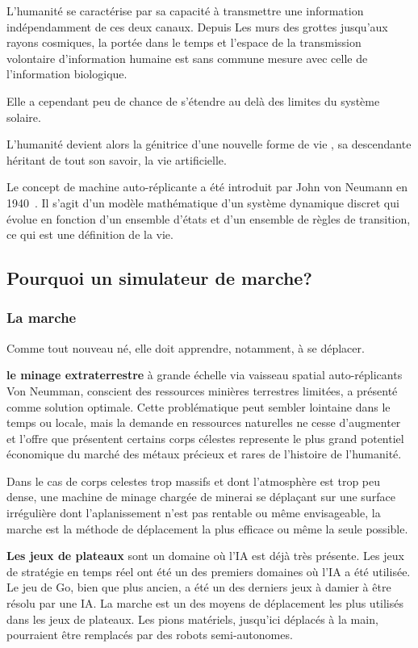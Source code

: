 \documentclass[journal, a4paper]{IEEEtran}
\begin{document}
	L'humanité se caractérise par sa capacité à transmettre une
	information indépendamment de ces deux canaux. Depuis Les murs
	des grottes jusqu'aux rayons cosmiques, la portée dans le temps et
	l'espace de la transmission volontaire d'information humaine est
	sans commune mesure avec
	celle de l'information biologique.

	Elle a cependant peu de chance de s'étendre au delà des limites du
	système solaire.

	L'humanité devient alors la génitrice d'une nouvelle forme de vie
	, sa
	descendante héritant de tout son savoir,
	la vie artificielle.

	Le concept de machine auto-réplicante a été introduit par John
	von Neumann en 1940~\cite{replicating-automata}.
	Il s'agit d'un modèle
	mathématique d'un système dynamique discret qui évolue en fonction
	d'un ensemble d'états et d'un ensemble de règles de transition,
	ce qui est une définition de la vie.

	\subsection{Pourquoi un simulateur de marche?}
	\subsubsection{La marche}
	Comme tout nouveau né, elle doit apprendre, notamment, à se
	déplacer.

	\textbf{le minage extraterrestre} à grande échelle via vaisseau
	spatial auto-réplicants
	Von Neumman, conscient des ressources minières terrestres limitées,
	a présenté  comme solution optimale.
	Cette problématique peut sembler lointaine dans le temps ou locale,
	mais
	la demande en
	ressources naturelles ne cesse d'augmenter et l'offre que présentent
	certains corps célestes represente le plus grand potentiel économique
	du marché des métaux précieux et rares de l'histoire de l'humanité.

	Dans le cas de corps
	celestes trop massifs et dont l'atmosphère est trop peu dense,
	une machine
	de minage chargée de
	minerai se déplaçant sur une surface irrégulière dont l'aplanissement
	n'est pas rentable ou même envisageable, la marche est
	la méthode	de déplacement la plus efficace ou même la seule
	possible.

	\textbf{Les jeux de plateaux} sont un domaine où l'IA est
	déjà très présente. Les jeux de stratégie en temps réel
	ont été un des premiers domaines où l'IA a été utilisée.
	Le jeu de Go, bien que plus ancien, a été un des derniers
	jeux à damier à être résolu par une IA. La marche est un des
	moyens de déplacement les plus utilisés dans les jeux de
	plateaux. Les pions matériels, jusqu'ici déplacés à la main,
	pourraient être remplacés par des robots semi-autonomes.
\end{document}
